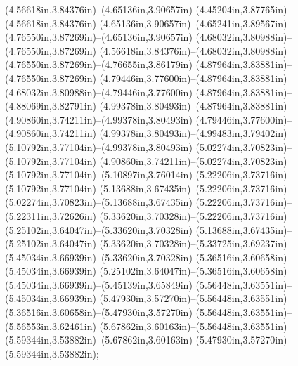(4.56618in,3.84376in)--(4.65136in,3.90657in) (4.45204in,3.87765in)--(4.56618in,3.84376in) (4.65136in,3.90657in)--(4.65241in,3.89567in) (4.76550in,3.87269in)--(4.65136in,3.90657in) (4.68032in,3.80988in)--(4.76550in,3.87269in) (4.56618in,3.84376in)--(4.68032in,3.80988in) (4.76550in,3.87269in)--(4.76655in,3.86179in) (4.87964in,3.83881in)--(4.76550in,3.87269in) (4.79446in,3.77600in)--(4.87964in,3.83881in) (4.68032in,3.80988in)--(4.79446in,3.77600in) (4.87964in,3.83881in)--(4.88069in,3.82791in) (4.99378in,3.80493in)--(4.87964in,3.83881in) (4.90860in,3.74211in)--(4.99378in,3.80493in) (4.79446in,3.77600in)--(4.90860in,3.74211in) (4.99378in,3.80493in)--(4.99483in,3.79402in) (5.10792in,3.77104in)--(4.99378in,3.80493in) (5.02274in,3.70823in)--(5.10792in,3.77104in) (4.90860in,3.74211in)--(5.02274in,3.70823in) (5.10792in,3.77104in)--(5.10897in,3.76014in) (5.22206in,3.73716in)--(5.10792in,3.77104in) (5.13688in,3.67435in)--(5.22206in,3.73716in) (5.02274in,3.70823in)--(5.13688in,3.67435in) (5.22206in,3.73716in)--(5.22311in,3.72626in) (5.33620in,3.70328in)--(5.22206in,3.73716in) (5.25102in,3.64047in)--(5.33620in,3.70328in) (5.13688in,3.67435in)--(5.25102in,3.64047in) (5.33620in,3.70328in)--(5.33725in,3.69237in) (5.45034in,3.66939in)--(5.33620in,3.70328in) (5.36516in,3.60658in)--(5.45034in,3.66939in) (5.25102in,3.64047in)--(5.36516in,3.60658in) (5.45034in,3.66939in)--(5.45139in,3.65849in) (5.56448in,3.63551in)--(5.45034in,3.66939in) (5.47930in,3.57270in)--(5.56448in,3.63551in) (5.36516in,3.60658in)--(5.47930in,3.57270in) (5.56448in,3.63551in)--(5.56553in,3.62461in) (5.67862in,3.60163in)--(5.56448in,3.63551in) (5.59344in,3.53882in)--(5.67862in,3.60163in) (5.47930in,3.57270in)--(5.59344in,3.53882in);
